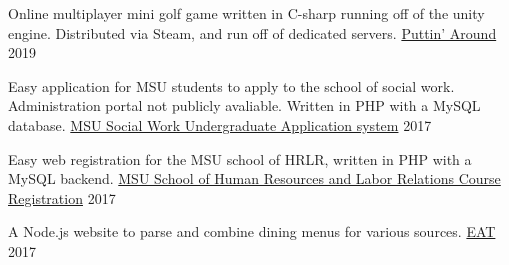 
\begin{cventries}
  \cventry
    {Online multiplayer mini golf game written in C-sharp running off of the unity engine. Distributed via Steam,
    and run off of dedicated servers.}
    {\href{https://store.steampowered.com/app/1002650/Puttin_Around/}{Puttin' Around}}
    {}
    {2019}
    {
    }

    \cventry
    {Easy application for MSU students to apply to the school of social work. Administration portal not publicly avaliable.
    Written in PHP with a MySQL database.}
    {\href{https://swdb.socialwork.msu.edu/basw/}{MSU Social Work Undergraduate Application system}}
    {}
    {2017}
    {
    }

    \cventry
    {Easy web registration for the MSU school of HRLR, written in PHP with a MySQL backend. }
    {\href{https://hrlr.msu.edu/registration/login.php}{MSU School of Human Resources and Labor Relations Course Registration}}
    {}
    {2017}
    {
    }

  \cventry
    {A Node.js website to parse and combine dining menus for various sources.}
    {\href{https://github.com/oonis/eat}{EAT}}
    {}
    {2017}
    {
    }



\end{cventries}
